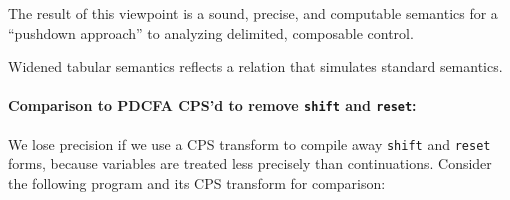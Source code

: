 The result of this viewpoint is a sound, precise, and computable semantics for a ``pushdown approach'' to analyzing delimited, composable control.

\begin{theorem}\label{thm:sound-sr}
  Widened tabular semantics reflects a relation that simulates standard semantics.
\end{theorem}

\paragraph{Comparison to PDCFA CPS'd to remove {\tt shift} and {\tt reset}:}{
We lose precision if we use a CPS transform to compile away {\tt shift} and {\tt reset} forms, because variables are treated less precisely than continuations.
%
%
%
Consider the following program and its CPS transform for comparison:
\begin{SCodeFlow}\begin{RktBlk}\begin{SingleColumn}\RktPn{(}\mbox{}\RktPn{(}\RktPn{[}\mbox{}\RktPn{(}\RktSym{$\lambda$}\mbox{}\RktPn{(}\RktPn{)}\mbox{}\RktPn{)}\RktPn{]}

\mbox{}\RktPn{[}\mbox{}\RktPn{(}\RktSym{$\lambda$}\mbox{}\RktPn{(}\RktPn{)}\mbox{}\RktPn{(}\mbox{}\mbox{}\RktPn{(}\mbox{}\RktPn{(}\mbox{}\RktPn{)}\RktPn{)}\RktPn{)}\RktPn{)}\RktPn{]}

\mbox{}\RktPn{[}\mbox{}\RktPn{(}\RktSym{$\lambda$}\mbox{}\RktPn{(}\RktPn{)}\mbox{}\RktPn{(}\mbox{}\RktPn{(}\mbox{}\RktPn{(}\mbox{}\RktPn{)}\RktPn{)}\RktPn{)}\RktPn{)}\RktPn{]}\RktPn{)}


\end{SingleColumn}
\end{RktBlk}
\end{SCodeFlow}}
